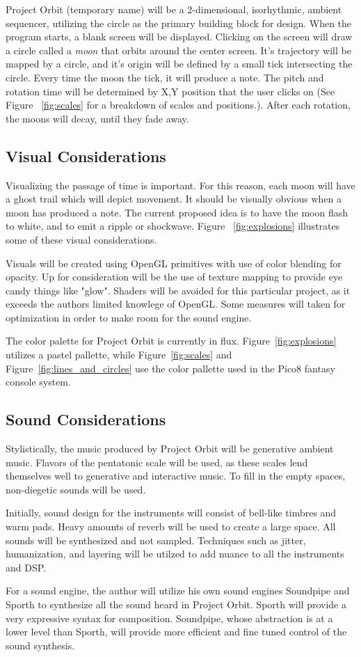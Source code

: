 \documentclass[11pt, twocolumn]{article}
\begin{document}
Project Orbit (temporary name) will be a 2-dimensional, isorhythmic, ambient sequencer, utilizing
the circle as the primary building block for design. When the program starts, a 
blank screen will be displayed. Clicking on the screen will draw a circle called a \emph{moon} that orbits
around the center screen. It's trajectory will be mapped by a circle, and it's origin will be defined by a 
small tick intersecting the circle.
Every time the moon the tick, it will produce
a note. The pitch and rotation time will be determined by X,Y position that the
user clicks on (See Figure ~\ref{fig:scales} for a breakdown of scales and positions.). 
After each rotation, the moons will decay, until they fade away. 


\subsection{Visual Considerations}
Visualizing the passage of time is important. For this reason, each moon will have
a ghost trail which will depict movement. 
It should be visually obvious when a moon 
has produced a note. The current proposed idea is to have the moon flash to white, and
to emit a ripple or shockwave. Figure ~\ref{fig:explosions} illustrates some of these visual considerations.

Visuals will be created using OpenGL primitives with use of color blending for 
opacity. Up for consideration will be the use of texture mapping to provide eye candy things like "glow". 
Shaders will be avoided for this particular project, as it exceeds
the authors limited knowlege of OpenGL. Some measures will taken for optimization in order
to make room for the sound engine.

The color palette for Project Orbit is currently in flux. 
Figure~\ref{fig:explosions} utilizes a pastel pallette, while
Figure~\ref{fig:scales} and Figure~\ref{fig:lines_and_circles} use the color pallette 
used in the Pico8 fantasy console system. 

\subsection{Sound Considerations}

Stylistically, the music produced by Project Orbit will be generative ambient music. 
Flavors of
the pentatonic scale will be used, as these scales lend themselves well to generative
and interactive music. To fill in the empty spaces, non-diegetic sounds will be used. 

Initially, sound design for the instruments will consist of bell-like timbres and warm pads. 
Heavy amounts of reverb will be used to create a large space. All sounds will be
synthesized and not sampled. Techniques such as jitter, humanization, and layering will
be utilzed to add nuance to all the instruments and DSP.

For a sound engine, the author will utilize his own sound engines Soundpipe and Sporth 
to synthesize all the sound heard in Project Orbit. Sporth will provide a very
expressive syntax for composition. Soundpipe, whose abstraction is at a lower level 
than Sporth, will provide more efficient and fine tuned control of the sound synthesis.
\end{document}
